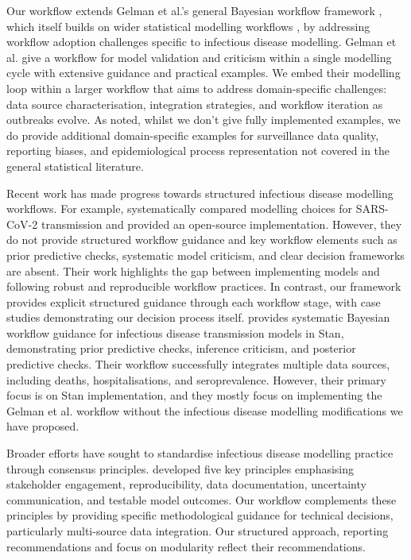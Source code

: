 \documentclass{article}
\begin{document}
Our workflow extends Gelman et al.'s general Bayesian workflow framework \citep{gelman2020bayesian}, which itself builds on wider statistical modelling workflows \citep{box1979robustness,Box1980,green2003highly}, by addressing workflow adoption challenges specific to infectious disease modelling.
Gelman et al. give a workflow for model validation and criticism within a single modelling cycle with extensive guidance and practical examples.
We embed their modelling loop within a larger workflow that aims to address domain-specific challenges: data source characterisation, integration strategies, and workflow iteration as outbreaks evolve. 
As noted, whilst we don't give fully implemented examples, we do provide additional domain-specific examples for surveillance data quality, reporting biases, and epidemiological process representation not covered in the general statistical literature.
 
Recent work has made progress towards structured infectious disease modelling workflows.
For example, \citet{bouman2024bayesian} systematically compared modelling choices for \ac{SARS-CoV-2} transmission and provided an open-source implementation.
However, they do not provide structured workflow guidance and key workflow elements such as prior predictive checks, systematic model criticism, and clear decision frameworks are absent.
Their work highlights the gap between implementing models and following robust and reproducible workflow practices.
In contrast, our framework provides explicit structured guidance through each workflow stage, with case studies demonstrating our decision process itself.
\citet{grinsztajn2021bayesian} provides systematic Bayesian workflow guidance for infectious disease transmission models in Stan, demonstrating prior predictive checks, inference criticism, and posterior predictive checks. 
Their workflow successfully integrates multiple data sources, including deaths, hospitalisations, and seroprevalence. 
However, their primary focus is on Stan implementation, and they mostly focus on implementing the Gelman et al. workflow without the infectious disease modelling modifications we have proposed.

Broader efforts have sought to standardise infectious disease modelling practice through consensus principles. \citet{Behrend2020-au} developed five key principles emphasising stakeholder engagement, reproducibility, data documentation, uncertainty communication, and testable model outcomes. 
Our workflow complements these principles by providing specific methodological guidance for technical decisions, particularly multi-source data integration.
Our structured approach, reporting recommendations and focus on modularity reflect their recommendations.
\end{document}
